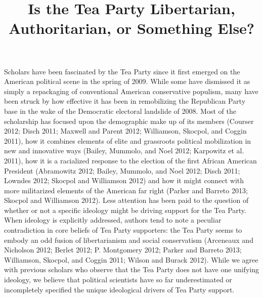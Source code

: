 \documentclass[12pt,]{article}
\title{Is the Tea Party Libertarian, Authoritarian, or Something Else?
\vspace{1.25em}}
\author{}
\date{}
\begin{document}
\maketitle

\doublespacing

Scholars have been fascinated by the Tea Party since it first emerged on
the American political scene in the spring of 2009. While some have
dismissed it as simply a repackaging of conventional American
conservative populism, many have been struck by how effective it has
been in remobilizing the Republican Party base in the wake of the
Democratic electoral landslide of 2008. Most of the scholarship has
focused upon the demographic make up of its members (Courser 2012; Disch
2011; Maxwell and Parent 2012; Williamson, Skocpol, and Coggin 2011),
how it combines elements of elite and grassroots political mobilization
in new and innovative ways (Bailey, Mummolo, and Noel 2012; Karpowitz et
al. 2011), how it is a racialized response to the election of the first
African American President (Abramowitz 2012; Bailey, Mummolo, and Noel
2012; Disch 2011; Lowndes 2012; Skocpol and Williamson 2012) and how it
might connect with more militarized elements of the American far right
(Parker and Barreto 2013; Skocpol and Williamson 2012). Less attention
has been paid to the question of whether or not a specific ideology
might be driving support for the Tea Party. When ideology is explicitly
addressed, authors tend to note a peculiar contradiction in core beliefs
of Tea Party supporters: the Tea Party seems to embody an odd fusion of
libertarianism and social conservatism (Arceneaux and Nicholson 2012;
Berlet 2012; P. Montgomery 2012; Parker and Barreto 2013; Williamson,
Skocpol, and Coggin 2011; Wilson and Burack 2012). While we agree with
previous scholars who observe that the Tea Party does not have one
unifying ideology, we believe that political scientists have so far
underestimated or incompletely specified the unique ideological drivers
of Tea Party support.
\end{document}
